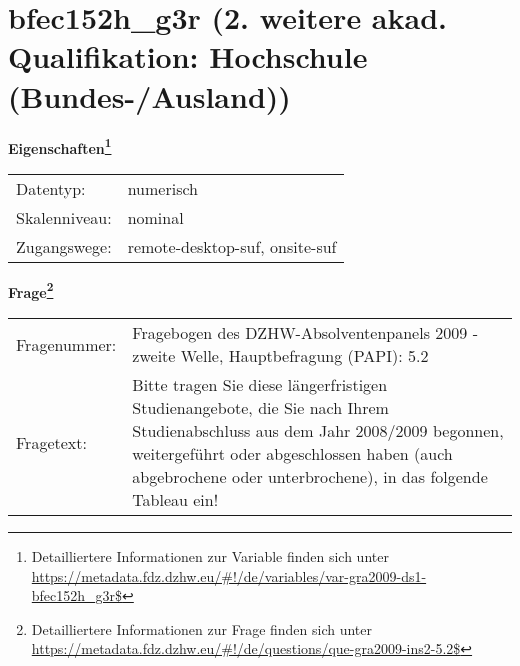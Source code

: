 
    \setcounter{footnote}{0}

    \vspace*{-1.8cm}
	\section{bfec152h\_g3r (2. weitere akad. Qualifikation: Hochschule (Bundes-/Ausland))}
	\label{section:bfec152h_g3r}



    \vspace*{0.5cm}
    \noindent\textbf{Eigenschaften\footnote{Detailliertere Informationen zur Variable finden sich unter
		\url{https://metadata.fdz.dzhw.eu/\#!/de/variables/var-gra2009-ds1-bfec152h_g3r$}}}\\
	\begin{tabularx}{\hsize}{@{}lX}
	Datentyp: & numerisch \\
	Skalenniveau: & nominal \\
	Zugangswege: &
	  remote-desktop-suf, 
	  onsite-suf
 \\
    \end{tabularx}



				\vspace*{0.5cm}
                \noindent\textbf{Frage\footnote{Detailliertere Informationen zur Frage finden sich unter
		              \url{https://metadata.fdz.dzhw.eu/\#!/de/questions/que-gra2009-ins2-5.2$}}}\\
				\begin{tabularx}{\hsize}{@{}lX}
					Fragenummer: &
					  Fragebogen des DZHW-Absolventenpanels 2009 - zweite Welle, Hauptbefragung (PAPI):
					  5.2
 \\
					Fragetext: & Bitte tragen Sie diese längerfristigen Studienangebote, die Sie nach Ihrem Studienabschluss aus dem Jahr 2008/2009 begonnen, weitergeführt oder abgeschlossen haben (auch abgebrochene oder unterbrochene), in das folgende Tableau ein! \\
				\end{tabularx}





